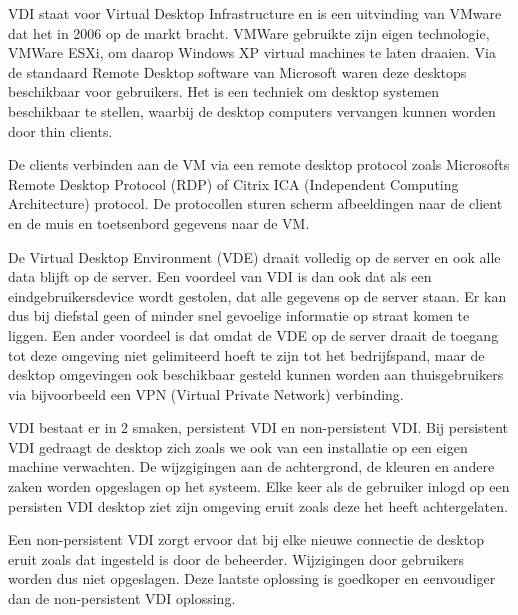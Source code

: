 VDI staat voor Virtual Desktop Infrastructure en is een uitvinding van VMware dat het in 2006 op de markt bracht. VMWare gebruikte zijn eigen technologie, VMWare ESXi, om daarop Windows XP virtual machines te laten draaien. Via de standaard Remote Desktop software van Microsoft waren deze desktops beschikbaar voor gebruikers. Het is een techniek om desktop systemen beschikbaar te stellen, waarbij de desktop computers vervangen kunnen worden door thin clients.

De clients verbinden aan de VM via een remote desktop protocol zoals Microsofts Remote Desktop Protocol (RDP) of Citrix ICA (Independent Computing Architecture) protocol. De protocollen sturen scherm afbeeldingen naar de client en de muis en toetsenbord gegevens naar de VM.

De Virtual Desktop Environment (VDE) draait volledig op de server en ook alle data blijft op de server. Een voordeel van VDI is dan ook dat als een eindgebruikersdevice wordt gestolen, dat alle gegevens op de server staan. Er kan dus bij diefstal geen of minder snel gevoelige informatie op straat komen te liggen. Een ander voordeel is dat omdat de VDE op de server draait de toegang tot deze omgeving niet gelimiteerd hoeft te zijn tot het bedrijfspand, maar de desktop omgevingen ook beschikbaar gesteld kunnen worden aan thuisgebruikers via bijvoorbeeld een VPN (Virtual Private Network) verbinding.

VDI bestaat er in 2 smaken, persistent VDI en non-persistent VDI. Bij persistent VDI gedraagt de desktop zich zoals we ook van een installatie op een eigen machine verwachten. De wijzgigingen aan de achtergrond, de kleuren en andere zaken worden opgeslagen op het systeem. Elke keer als de gebruiker inlogd op een persisten VDI desktop ziet zijn omgeving eruit zoals deze het heeft achtergelaten.

Een non-persistent VDI zorgt ervoor dat bij elke nieuwe connectie de desktop eruit zoals dat ingesteld is door de beheerder. Wijzigingen door gebruikers worden dus niet opgeslagen. Deze laatste oplossing is goedkoper en eenvoudiger dan de non-persistent VDI oplossing.

